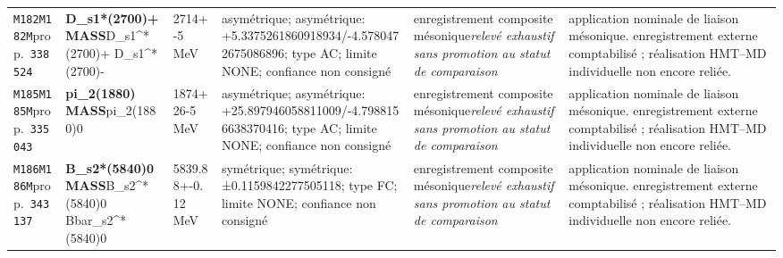 \begin{landscape}
\begin{longtable}{L{1.85cm}L{4.45cm}L{2.35cm}L{4.05cm}L{3.35cm}L{7.15cm}}
\texttt{M182}\newline \texttt{M182M}\newline prop.\ \texttt{338524} & \textbf{D\_\allowbreak{}s1*(2700)+ MASS}\newline D\_\allowbreak{}s1\textasciicircum{}*(2700)+ \textbar{}\allowbreak{} D\_\allowbreak{}s1\textasciicircum{}*(2700)- & 2714+-5\,MeV & asymétrique; asymétrique: +5.3375261860918934/-4.5780472675086896; type AC; limite NONE; confiance non consigné & enregistrement composite mésonique\newline \emph{relevé exhaustif sans promotion au statut de comparaison} & application nominale de liaison mésonique. enregistrement externe comptabilisé ; réalisation HMT--MD individuelle non encore reliée. \\
\texttt{M185}\newline \texttt{M185M}\newline prop.\ \texttt{335043} & \textbf{pi\_\allowbreak{}2(1880) MASS}\newline pi\_\allowbreak{}2(1880)0 & 1874+26-5\,MeV & asymétrique; asymétrique: +25.897946058811009/-4.7988156638370416; type AC; limite NONE; confiance non consigné & enregistrement composite mésonique\newline \emph{relevé exhaustif sans promotion au statut de comparaison} & application nominale de liaison mésonique. enregistrement externe comptabilisé ; réalisation HMT--MD individuelle non encore reliée. \\
\texttt{M186}\newline \texttt{M186M}\newline prop.\ \texttt{343137} & \textbf{B\_\allowbreak{}s2*(5840)0 MASS}\newline B\_\allowbreak{}s2\textasciicircum{}*(5840)0 \textbar{}\allowbreak{} Bbar\_\allowbreak{}s2\textasciicircum{}*(5840)0 & 5839.88+-0.12\,MeV & symétrique; symétrique: ±0.1159842277505118; type FC; limite NONE; confiance non consigné & enregistrement composite mésonique\newline \emph{relevé exhaustif sans promotion au statut de comparaison} & application nominale de liaison mésonique. enregistrement externe comptabilisé ; réalisation HMT--MD individuelle non encore reliée. \\

\end{longtable}
\end{landscape}

